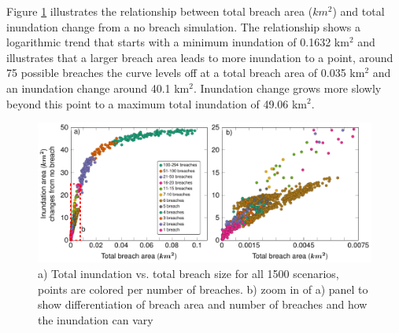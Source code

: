 \documentclass{coastal_paper}
\begin{document}
Figure \ref{fig:5} illustrates the relationship between total breach area ($km^2$) and total inundation change from a no breach simulation. The relationship shows a logarithmic trend that starts with a minimum inundation of 0.1632 km$^2$ and illustrates that a larger breach area leads to more inundation to a point, around 75 possible breaches the curve levels off at a total breach area of 0.035 km$^2$ and an inundation change around 40.1 km$^2$. Inundation change grows more slowly beyond this point to a maximum total inundation of 49.06 km$^2$.

\begin{figure}[ht]
    \centering
    \includegraphics[width=\textwidth]{figures/fig5_fixed.pdf}
    \caption{a) Total inundation vs. total breach size for all 1500 scenarios, points are colored per number of breaches. b) zoom in of a) panel to show differentiation of breach area and number of breaches and how the inundation can vary}
    \label{fig:5}
\end{figure}
\end{document}
